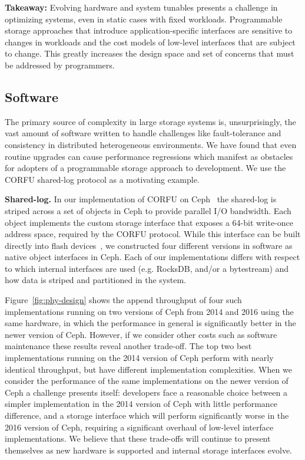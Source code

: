 \textbf{Takeaway:} Evolving hardware and system tunables presents a challenge
in optimizing systems, even in static cases with fixed workloads. Programmable
storage approaches that introduce application-specific interfaces are
sensitive to changes in workloads and the cost models of
low-level interfaces that are subject to change. This greatly increases the design
space and set of concerns that must be addressed by programmers.

\subsection{Software}
\label{software}

The primary source of complexity in large storage systems is, unsurprisingly,
the vast amount of software written to handle challenges like fault-tolerance
and consistency in distributed heterogeneous environments. We have found that
even routine upgrades can cause performance regressions which manifest as obstacles 
for adopters of a programmable storage approach to development. We use the
CORFU shared-log protocol as a motivating example.

{\bf Shared-log.} In our implementation of CORFU on Ceph~\cite{zlog} the shared-log is striped
across a set of objects in Ceph to provide parallel I/O bandwidth. Each object
implements the custom storage interface that exposes a 64-bit write-once address
space, required by the CORFU protocol.  While this interface can be
built directly into flash devices~\cite{wei:systor13}, we constructed four
different versions in software as native object interfaces in Ceph. Each of our
implementations differs with respect to which internal interfaces are used
(e.g. RocksDB, and/or a bytestream) and how data is striped and partitioned in the system.

Figure~\ref{fig:phy-design} shows the append throughput of four such
implementations running on two versions of Ceph from 2014 and 2016 using the same hardware, in which
the performance in general is significantly better in the newer version of
Ceph. However, if we consider other costs such as software maintenance these results
reveal another trade-off. The top two best implementations running on
the 2014 version of Ceph perform with nearly identical throughput, but
have different implementation complexities. When we consider the performance
of the same implementations on the newer version of Ceph a challenge presents
itself: developers face a reasonable choice between a simpler implementation in the
2014 version of Ceph with little performance difference, and a storage
interface which will perform significantly worse in the 2016 version of Ceph,
requiring a significant overhaul of low-level interface implementations. We
believe that these trade-offs will continue to present themselves as new
hardware is supported and internal storage interfaces evolve.

